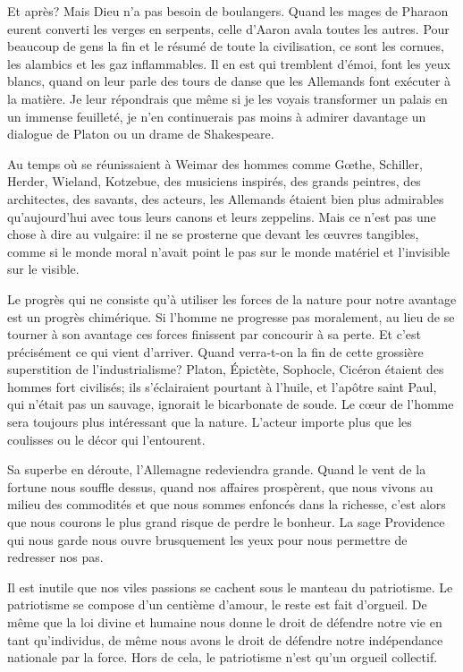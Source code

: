 \begin{chapter}{Et après?}
Mais Dieu n'a pas besoin de boulangers. Quand les mages de Pharaon
eurent converti les verges en serpents, celle d'Aaron avala toutes les
autres. Pour beaucoup de gens la fin et le résumé de toute la
civilisation, ce sont les cornues, les alambics et les gaz inflammables.
Il en est qui tremblent d'émoi, font les yeux blancs, quand on leur
parle des tours de danse que les Allemands font exécuter à la matière.
Je leur répondrais que même si je les voyais transformer un palais en un
immense feuilleté, je n'en continuerais pas moins à admirer davantage un
dialogue de Platon ou un drame de Shakespeare.

Au temps où se réunissaient à Weimar des hommes comme Gœthe,
Schiller, Herder, Wieland, Kotzebue, des musiciens inspirés, des grands
peintres, des architectes, des savants, des acteurs, les Allemands
étaient bien plus admirables qu'aujourd'hui avec tous leurs canons et
leurs zeppelins. Mais ce n'est pas une chose à dire au vulgaire: il ne
se prosterne que devant les œuvres tangibles, comme si le monde moral
n'avait point le pas sur le monde matériel et l'invisible sur le
visible.

Le progrès qui ne consiste qu'à utiliser les forces de la nature pour
notre avantage est un progrès chimérique. Si l'homme ne progresse pas
moralement, au lieu de se tourner à son avantage ces forces finissent
par concourir à sa perte. Et c'est précisément ce qui vient d'arriver.
Quand verra-t-on la fin de cette grossière superstition de
l'industrialisme? Platon, Épictète, Sophocle, Cicéron étaient des hommes
fort civilisés; ils s'éclairaient pourtant à l'huile, et l'apôtre saint
Paul, qui n'était pas un sauvage, ignorait le bicarbonate de soude. Le
cœur de l'homme sera toujours plus intéressant que la nature.
L'acteur importe plus que les coulisses ou le décor qui l'entourent.

Sa superbe en déroute, l'Allemagne redeviendra grande. Quand le vent de
la fortune nous souffle dessus, quand nos affaires prospèrent, que nous
vivons au milieu des commodités et que nous sommes enfoncés dans la
richesse, c'est alors que nous courons le plus grand risque de perdre le
bonheur. La sage Providence qui nous garde nous ouvre brusquement les
yeux pour nous permettre de redresser nos pas.

Il est inutile que nos viles passions se cachent sous le manteau du
patriotisme. Le patriotisme se compose d'un centième d'amour, le reste
est fait d'orgueil. De même que la loi divine et humaine nous donne le
droit de défendre notre vie en tant qu'individus, de même nous avons le
droit de défendre notre indépendance nationale par la force. Hors de
cela, le patriotisme n'est qu'un orgueil collectif.


\end{chapter}
